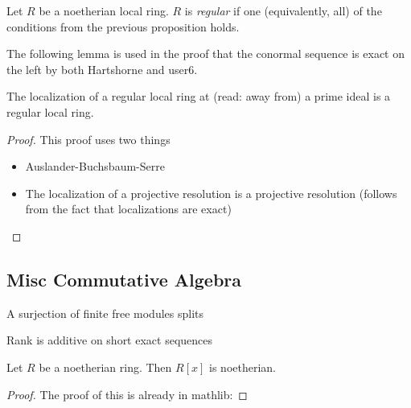 \begin{definition} \label{def:regular}
	Let \(R\) be a noetherian local ring.
	\(R\) is \textit{regular} if one (equivalently, all)
	of the conditions from the previous proposition holds.
\end{definition}

The following lemma is used in the proof that the 
conormal sequence is exact on the left by both 
Hartshorne and user6.

\begin{lemma} \label{lem:regular_localizes}
	The localization of a regular local ring at (read: away from) a prime 
	ideal is a regular local ring.
\end{lemma}

\begin{proof}
	This proof uses two things
	\begin{itemize}
		\item Auslander-Buchsbaum-Serre
		\item The localization of a projective resolution
			is a projective resolution
			(follows from the fact that localizations are exact)
	\end{itemize}
\end{proof}


\subsection{Misc Commutative Algebra}

\begin{lemma}
  \label{lem:finite_free_surj_splits}
  A surjection of finite free modules splits
\end{lemma}

\begin{lemma}
  \label{lem:rank_additive_exact_seq}
  Rank is additive on short exact sequences
\end{lemma}

\begin{theorem}
  \label{thm:hilbert_basis}
  Let $R$ be a noetherian ring.
  Then $R[x]$ is noetherian.
\end{theorem}

\begin{proof}
  The proof of this is already in mathlib:
\end{proof}


